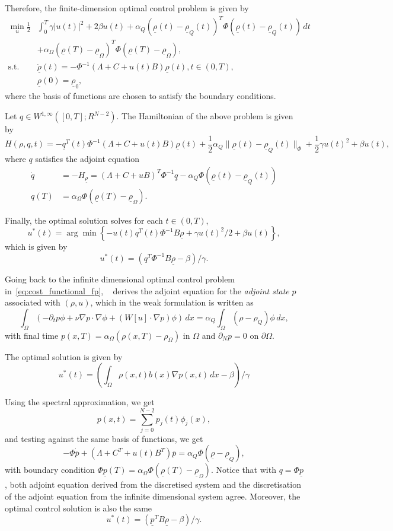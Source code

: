 \documentclass[12pt]{article}
\newcommand{\rhovec}{\underline{\rho}}
\theoremstyle{definition}
\begin{document}
Therefore, the finite-dimension optimal control problem is given by
\begin{align*}
    \min_u \frac{1}{2} &\int_0^T \gamma|u(t)|^2 + 2\beta u(t) + \alpha_Q {(\rhovec(t) - \rhovec_Q(t))}^T  \Phi {(\rhovec(t) - \rhovec_Q(t))} \, dt \\ 
    &+ \alpha_{\Omega} {(\rhovec(T) - \rhovec_{\Omega})}^T  \Phi {(\rhovec(T) - \rhovec_{\Omega})}, \\
    \text{s.t. } &\dot{\rhovec}(t) = -\Phi^{-1}(\Lambda + C + u(t) B) \rhovec(t), t \in (0,T), \\
    &\rhovec(0) = \rhovec_0,
\end{align*}
where the basis of functions are chosen to satisfy the boundary conditions.

Let $q \in W^{1,\infty}([0,T]; R^{N-2})$. 
The Hamiltonian of the above problem is given by
\[
H(\rho,q,t) = -\underline{q}^T(t) \Phi^{-1} (\Lambda + C + u(t)B) \rhovec(t) + \frac{1}{2}\alpha_Q  \|\rhovec(t) - \rhovec_Q(t)\|_{\Phi} + \frac{1}{2}\gamma {u(t)}^2 + \beta u(t),
\]
where $q$ satisfies the adjoint equation
\begin{align*}
    \dot{q} &= - H_{\rhovec} = {(\Lambda + C + uB)}^T\Phi^{-1} \underline{q} - \alpha_Q \Phi {(\rhovec(t) - \rhovec_Q(t))} \\
    q(T) &= \alpha_{\Omega} \Phi(\rhovec(T) - \rhovec_{\Omega}).
\end{align*}

Finally, the optimal solution solves for each $t \in (0,T)$,
\[
u^*(t) = \arg \min \left\{-u(t)q^T(t)\Phi^{-1}B \rhovec + \gamma {u(t)}^2/2 + \beta u(t) \right\},
\]
which is given by
\[
u^*(t) = (q^T\Phi^{-1} B \rhovec - \beta)/\gamma.    
\]

Going back to the infinite dimensional optimal control problem in~\eqref{eq:cost_functional_fp}, 
~\cite{aronna2021first} derives the adjoint equation for the {\em adjoint state\/} $p$ associated with $(\rho, u)$, which in the weak formulation is written as
\[
\int_{\Omega} \left(-\partial_t p \phi + \nu \nabla p \cdot \nabla \phi + (W[u]\cdot\nabla p) \phi\right) \, dx = \alpha_Q \int_{\Omega} (\rho - \rho_Q) \phi \, dx,
\]
with final time $p(x,T) = \alpha_{\Omega}(\rho(x,T) - \rho_{\Omega})$ in $\Omega$ and $\partial_N p = 0$ on $\partial \Omega$.

The optimal solution is given by 
\[
u^*(t) = \left(\int_{\Omega} \rho(x,t) b(x) \nabla p(x,t) \, dx  - \beta \right)/\gamma
\]

Using the spectral approximation, we get 
\[
p(x,t) = \sum_{j=0}^{N-2} p_j(t) \phi_j(x),
\]
and testing against the same basis of functions, we get 
\[
-\Phi \dot{\overline{p}} + (\Lambda + C^T + u(t) B^T)\overline{p} = \alpha_Q \Phi (\rhovec - \rhovec_Q),
\]
with boundary condition $\Phi \underline{p}(T) = \alpha_{\Omega}\Phi(\rhovec(T) - \rhovec_{\Omega})$.
Notice that with $q = \Phi \underline{p}$, both adjoint equation derived from the discretised system and the discretisation of the adjoint equation from the infinite dimensional system agree.
Moreover, the optimal control solution is also the same
\[
u^*(t) = (\underline{p}^T B\rhovec - \beta)/\gamma.    
\]
\end{document}
